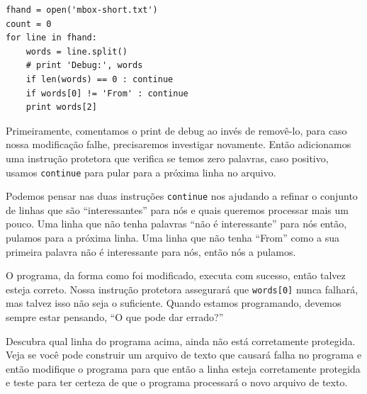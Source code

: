 \begin{enumerate}
\beforeverb
\begin{verbatim}
fhand = open('mbox-short.txt')
count = 0
for line in fhand:
    words = line.split()
    # print 'Debug:', words
    if len(words) == 0 : continue
    if words[0] != 'From' : continue
    print words[2]
\end{verbatim}
\afterverb
%

Primeiramente, comentamos o print de debug ao invés de removê-lo,
para caso nossa modificação falhe, precisaremos investigar novamente.
Então adicionamos uma instrução protetora que verifica se temos zero palavras, caso positivo,
usamos {\tt continue} para pular para a próxima linha no arquivo.

Podemos pensar nas duas instruções {\tt continue} nos ajudando a refinar
o conjunto de linhas que são ``interessantes'' para nós e quais queremos
processar mais um pouco. Uma linha que não tenha palavras ``não é interessante''
para nós então, pulamos para a próxima linha. Uma linha que não tenha ``From''
como a sua primeira palavra não é interessante para nós, então nós a pulamos.

O programa, da forma como foi modificado, executa com sucesso, então talvez esteja correto.
Nossa instrução protetora assegurará que {\tt words[0]} nunca falhará,
mas talvez isso não seja o suficiente. Quando estamos programando, devemos sempre estar pensando,
``O que pode dar errado?''

\begin{ex}
Descubra qual linha do programa acima, ainda não está corretamente protegida.
Veja se você pode construir um arquivo de texto que causará falha no programa e
então modifique o programa para que então a linha esteja corretamente protegida e
teste para ter certeza de que o programa processará o novo arquivo de texto.
\end{ex}


\end{enumerate}
